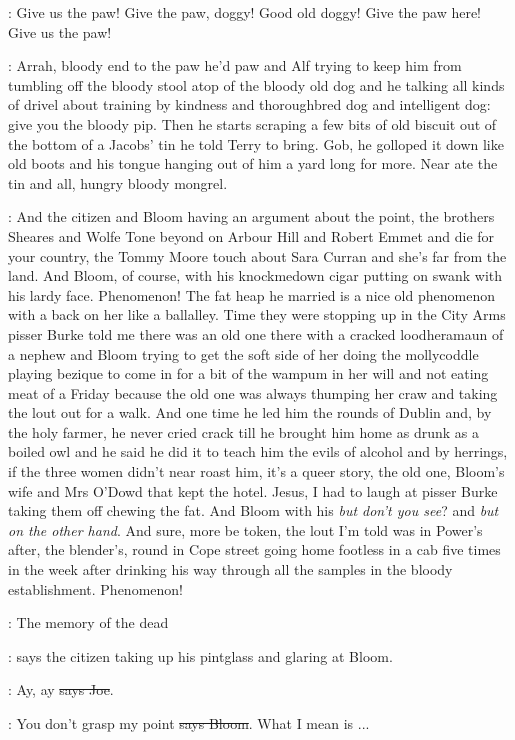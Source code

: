 \doran:
Give us the paw! Give the paw, doggy! Good old doggy! Give the paw
here! Give us the paw!

\Nq:
Arrah, bloody end to the paw he'd paw and Alf trying to keep him
from tumbling off the bloody stool atop of the bloody old dog and he
talking all kinds of drivel about training by kindness and thoroughbred
dog and intelligent dog: give you the bloody pip. Then he starts scraping
a few bits of old biscuit out of the bottom of a Jacobs' tin he told Terry
to bring. Gob, he golloped it down like old boots and his tongue hanging
out of him a yard long for more. Near ate the tin and all, hungry bloody
mongrel.

\Nq:
And the citizen and Bloom having an argument about the point, the
brothers Sheares and Wolfe Tone beyond on Arbour Hill and Robert
Emmet and die for your country, the Tommy Moore touch about Sara
Curran and she's far from the land. And Bloom, of course, with his
knockmedown cigar putting on swank with his lardy face. Phenomenon!
The fat heap he married is a nice old phenomenon with a back on her like a
ballalley. Time they were stopping up in the City Arms pisser Burke told
me there was an old one there with a cracked loodheramaun of a nephew and
Bloom trying to get the soft side of her doing the mollycoddle playing
bezique to come in for a bit of the wampum in her will and not eating meat
of a Friday because the old one was always thumping her craw and taking
the lout out for a walk. And one time he led him the rounds of Dublin and,
by the holy farmer, he never cried crack till he brought him home as drunk
as a boiled owl and he said he did it to teach him the evils of alcohol
and by herrings, if the three women didn't near roast him, it's a queer
story, the old one, Bloom's wife and Mrs O'Dowd that kept the hotel.
Jesus, I had to laugh at pisser Burke taking them off chewing the fat.
And Bloom with his \emph{but don't you see}? and
\emph{but on the other hand}. And sure,
more be token, the lout I'm told was in Power's after, the blender's,
round in Cope street going home footless in a cab five times in the week
after drinking his way through all the samples in the bloody
establishment. Phenomenon!

\citizen:
The memory of the dead

\Nq:
says the citizen taking up his pintglass and
glaring at Bloom.

\joe:
Ay, ay \sout{says Joe}.

\Bloom:
You don't grasp my point \sout{says Bloom}.
What I mean is ...

